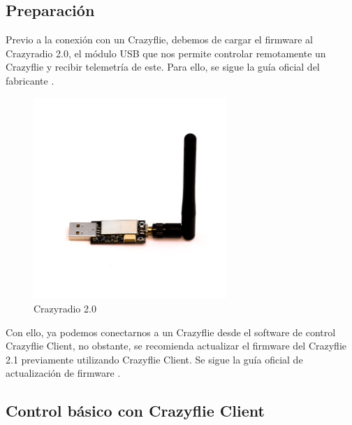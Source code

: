 \subsection{Preparación}

Previo a la conexión con un Crazyflie, debemos de cargar el firmware al Crazyradio 2.0, el módulo USB que nos permite controlar 
remotamente un Crazyflie y recibir telemetría de este. Para ello, se sigue la guía oficial del fabricante \cite{crazyradio_setup}.

\begin{figure}[h]
    \centering
    \includegraphics[width=0.65\textwidth]{img/fig/fig2.2-crazyradio.png}
    \caption{Crazyradio 2.0}
    \label{fig:crazyradio}
\end{figure}

Con ello, ya podemos conectarnos a un Crazyflie desde el software de control Crazyflie Client, no obstante, 
se recomienda actualizar el firmware del Crazyflie 2.1 previamente utilizando Crazyflie Client. 
Se sigue la guía oficial de actualización de firmware \cite{crazyflie_firmware_upgrade}.


\subsection{Control básico con Crazyflie Client}

